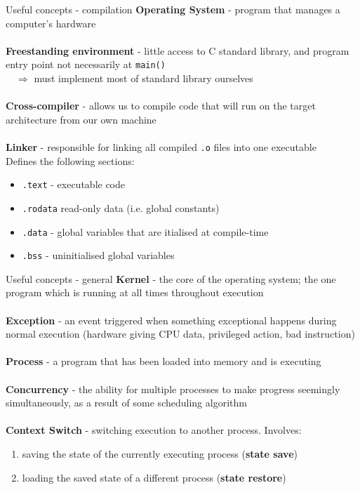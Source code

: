 \documentclass[10pt]{beamer}
\newcommand{\code}[1]{\texttt{#1}}
\begin{document}
\begin{frame}{Useful concepts - compilation}
    \textbf{Operating System} - program that manages a computer's hardware \\~\\
    \textbf{Freestanding environment} - little access to C standard library, and program entry point not necessarily at \texttt{main()} \\ $\quad \Rightarrow$ must implement most of standard library ourselves \\~\\
    \textbf{Cross-compiler} - allows us to compile code that will run on the target architecture from our own machine \\~\\
    \textbf{Linker} - responsible for linking all compiled \texttt{.o} files into one executable \\
    Defines the following sections:
    \begin{itemize}
        \item \code{.text} - executable code
        \item \code{.rodata} read-only data (i.e. global constants)
        \item \code{.data} - global variables that are itialised at compile-time
        \item \code{.bss} - uninitialised global variables
    \end{itemize}
\end{frame}

\begin{frame}{Useful concepts - general}
    \textbf{Kernel} - the core of the operating system; the one program which is running at all times throughout execution \\~\\

    \textbf{Exception} - an event triggered when something exceptional happens during normal execution (hardware giving CPU data, privileged action, bad instruction) \\~\\

    \textbf{Process} - a program that has been loaded into memory and is executing \\~\\

    \textbf{Concurrency} - the ability for multiple processes to make progress seemingly simultaneously, as a result of some scheduling algorithm \\~\\

    \textbf{Context Switch} - switching execution to another process. Involves:
    \begin{enumerate}
        \item saving the state of the currently executing process (\textbf{state save})
        \item loading the saved state of a different process (\textbf{state restore})
    \end{enumerate}
\end{frame}
\end{document}
